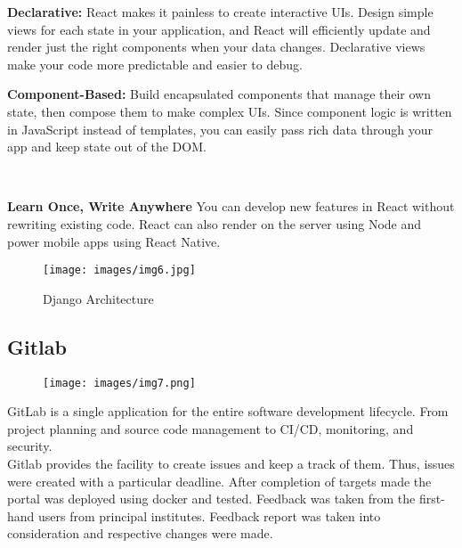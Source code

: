 \documentclass[12pt]{article}
\begin{document}
\hspace{1cm}\textbf{Declarative:} React makes it painless to create interactive UIs. Design simple views for each state in your application, and React will efficiently update and render just the right components when your data changes. 
Declarative views make your code more predictable and easier to debug. 
\\ \smallskip

\hspace{1cm}\textbf{Component-Based: }Build encapsulated components that manage their own state, then compose them to make complex UIs. 
Since component logic is written in JavaScript instead of templates, you can easily pass rich data through your app and keep state out of the DOM. 

\\ \smallskip

\hspace{1cm}\textbf{Learn Once, Write Anywhere } You can develop new features in React without rewriting existing code. React can also render on the server using Node and power mobile apps using React Native.  \\ \smallskip


\begin{figure}[ht]
\centering
\texttt{[image: images/img6.jpg]}
\caption{Django Architecture }
\label{fig:example}
\end{figure}


\subsection{\large{Gitlab}}
\begin{figure}[ht]
\centering
\texttt{[image: images/img7.png]}
\label{fig:example}
\end{figure}
\hspace{1cm}GitLab is a single application for the entire software development lifecycle. From project planning and source code management to CI/CD, monitoring, and security.  \\ \smallskip
\hspace{1cm}Gitlab provides the facility to create issues and keep a track of them. Thus, issues were created with a particular deadline. After completion of targets made the portal was deployed using docker and tested. Feedback was taken from the first-hand users from principal institutes. Feedback report was taken into consideration and respective changes were made. \\
\smallskip
\end{document}

